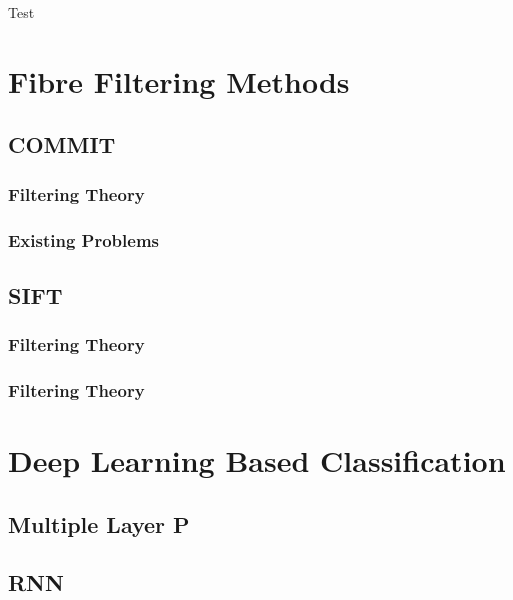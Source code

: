 Test \autocite{dhollanderFixelbasedAnalysisDiffusion2021}


\section{Fibre Filtering Methods}

\subsection{COMMIT}

\subsubsection{Filtering Theory}

\subsubsection{Existing Problems}

\subsection{SIFT}

\subsubsection{Filtering Theory}

\subsubsection{Filtering Theory}

\section{Deep Learning Based Classification}

\subsection{Multiple Layer P}
\subsection{RNN}




